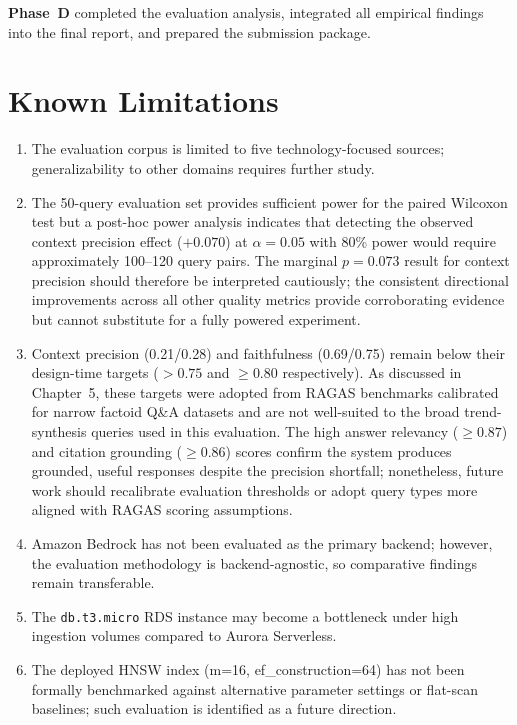 \textbf{Phase~D} completed the evaluation analysis, integrated all empirical findings into the final report, and prepared the submission package.

\section{Known Limitations}
\label{sec:limitations}

\begin{enumerate}[leftmargin=0.5in]
  \item The evaluation corpus is limited to five technology-focused sources; generalizability to other domains requires further study.

  \item The 50-query evaluation set provides sufficient power for the paired Wilcoxon test but a post-hoc power analysis indicates that detecting the observed context precision effect ($+0.070$) at $\alpha = 0.05$ with 80\% power would require approximately 100--120 query pairs. The marginal $p = 0.073$ result for context precision should therefore be interpreted cautiously; the consistent directional improvements across all other quality metrics provide corroborating evidence but cannot substitute for a fully powered experiment.

  \item Context precision (0.21/0.28) and faithfulness (0.69/0.75) remain below their design-time targets ($> 0.75$ and $\geq 0.80$ respectively). As discussed in Chapter~5, these targets were adopted from RAGAS benchmarks calibrated for narrow factoid Q\&A datasets and are not well-suited to the broad trend-synthesis queries used in this evaluation. The high answer relevancy ($\geq 0.87$) and citation grounding ($\geq 0.86$) scores confirm the system produces grounded, useful responses despite the precision shortfall; nonetheless, future work should recalibrate evaluation thresholds or adopt query types more aligned with RAGAS scoring assumptions.

  \item Amazon Bedrock has not been evaluated as the primary backend; however, the evaluation methodology is backend-agnostic, so comparative findings remain transferable.

  \item The \texttt{db.t3.micro} RDS instance may become a bottleneck under high ingestion volumes compared to Aurora Serverless.

  \item The deployed HNSW index (m=16, ef\_construction=64) has not been formally benchmarked against alternative parameter settings or flat-scan baselines; such evaluation is identified as a future direction.


\end{enumerate}
